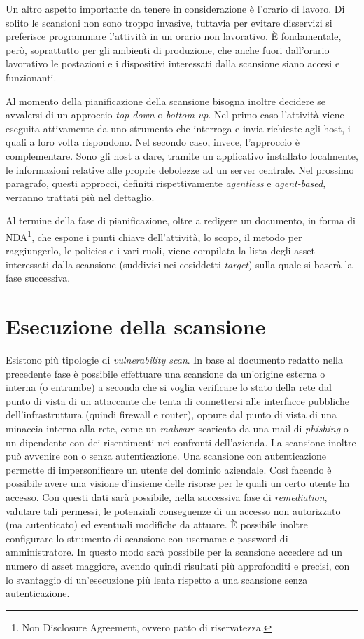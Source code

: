 \documentclass[target=mst,aauheader=]{thud}
\begin{document}
Un altro aspetto importante da tenere in considerazione è l’orario di lavoro. Di solito le scansioni non sono troppo invasive, tuttavia per evitare disservizi si preferisce programmare l’attività in un orario non lavorativo. È fondamentale, però, soprattutto per gli ambienti di produzione, che anche fuori dall’orario lavorativo le postazioni e i dispositivi interessati dalla scansione siano accesi e funzionanti.

Al momento della pianificazione della scansione bisogna inoltre decidere se avvalersi di un approccio \textit{top-down} o \textit{bottom-up}. Nel primo caso l’attività viene eseguita attivamente da uno strumento che interroga e invia richieste agli host, i quali a loro volta rispondono. Nel secondo caso, invece, l’approccio è complementare. Sono gli host a dare, tramite un applicativo installato localmente, le informazioni relative alle proprie debolezze ad un server centrale. Nel prossimo paragrafo, questi approcci, definiti rispettivamente \textit{agentless} e \textit{agent-based}, verranno trattati più nel dettaglio.

Al termine della fase di pianificazione, oltre a redigere un documento, in forma di NDA\footnote{Non Disclosure Agreement, ovvero patto di riservatezza.}, che espone i punti chiave dell’attività, lo scopo, il metodo per raggiungerlo, le policies e i vari ruoli, viene compilata la lista degli asset interessati dalla scansione (suddivisi nei cosiddetti \textit{target}) sulla quale si baserà la fase successiva.


\section{Esecuzione della scansione}
Esistono più tipologie di \textit{vulnerability scan}. In base al documento redatto nella precedente fase è possibile effettuare una scansione da un’origine esterna o interna (o entrambe) a seconda che si voglia verificare lo stato della rete dal punto di vista di un attaccante che tenta di connettersi alle interfacce pubbliche dell’infrastruttura (quindi firewall e router), oppure dal punto di vista di una minaccia interna alla rete, come un \textit{malware} scaricato da una mail di \textit{phishing} o un dipendente con dei risentimenti nei confronti dell’azienda. La scansione inoltre può avvenire con o senza autenticazione. Una scansione con autenticazione permette di impersonificare un utente del dominio aziendale. Così facendo è possibile avere una visione d’insieme delle risorse per le quali un certo utente ha accesso. Con questi dati sarà possibile, nella successiva fase di \textit{remediation}, valutare tali permessi, le potenziali conseguenze di un accesso non autorizzato (ma autenticato) ed eventuali modifiche da attuare. È possibile inoltre configurare lo strumento di scansione con username e password di amministratore. In questo modo sarà possibile per la scansione accedere ad un numero di asset maggiore, avendo quindi risultati più approfonditi e precisi, con lo svantaggio di un’esecuzione più lenta rispetto a una scansione senza autenticazione.
\end{document}
